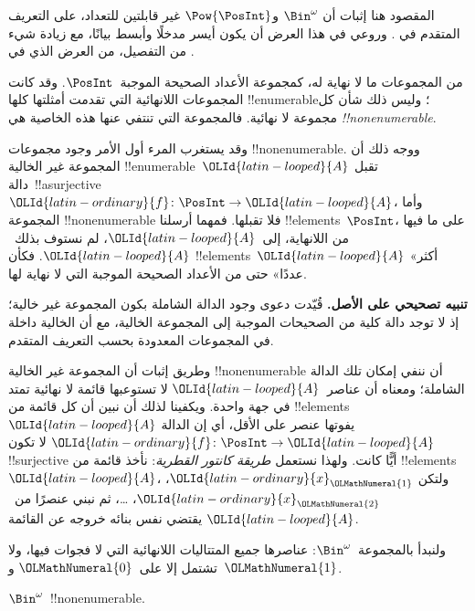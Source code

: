 \documentclass[../../../include/open-logic-section]{subfiles}
\begin{document}


\begin{editorial}
المقصود هنا إثبات أن $\Bin^\omega$ و$\Pow{\PosInt}$ غير قابلتين للتعداد، على التعريف المتقدم في . وروعي في هذا العرض أن يكون أيسر مدخلًا وأبسط بيانًا، مع زيادة شيء من التفصيل، من العرض الذي في .
\end{editorial}

من المجموعات ما لا نهاية له، كمجموعة الأعداد الصحيحة الموجبة~$\PosInt$. وقد كانت المجموعات اللانهائية التي تقدمت أمثلتها كلها !!{enumerable}؛ وليس ذلك شأن كل مجموعة لا نهائية. فالمجموعة التي تنتفي عنها هذه الخاصية هي \emph{!!{nonenumerable}}.

وقد يستغرب المرء أول الأمر وجود مجموعات !!{nonenumerable}. ووجه ذلك أن المجموعة غير الخالية !!{enumerable}~$\OLId{latin-looped}{A}$ تقبل دالة~!!a{surjective} $\OLId{latin-ordinary}{f} \colon \PosInt \to \OLId{latin-looped}{A}$، وأما المجموعة !!{nonenumerable} فلا تقبلها. فمهما أرسلنا !!{element}s~$\PosInt$، على ما فيها من اللانهاية، إلى~$\OLId{latin-looped}{A}$، لم نستوف بذلك~$\OLId{latin-looped}{A}$. فكأن !!{element}s~$\OLId{latin-looped}{A}$ «أكثر عددًا» حتى من الأعداد الصحيحة الموجبة التي لا نهاية لها.

\textbf{تنبيه تصحيحي على الأصل.} قُيّدت دعوى وجود الدالة الشاملة بكون
المجموعة غير خالية؛ إذ لا توجد دالة كلية من الصحيحات الموجبة إلى المجموعة الخالية،
مع أن الخالية داخلة في المجموعات المعدودة بحسب التعريف المتقدم.

وطريق إثبات أن المجموعة غير الخالية !!{nonenumerable} أن ننفي إمكان تلك الدالة الشاملة؛ ومعناه أن عناصر~$\OLId{latin-looped}{A}$ لا تستوعبها قائمة لا نهائية تمتد في جهة واحدة. ويكفينا لذلك أن نبين أن كل قائمة من !!{element}s~$\OLId{latin-looped}{A}$ يفوتها عنصر على الأقل، أي إن الدالة $\OLId{latin-ordinary}{f}\colon \PosInt \to \OLId{latin-looped}{A}$ لا تكون !!{surjective} أيًّا كانت. ولهذا نستعمل \emph{طريقة كانتور القطرية}: نأخذ قائمة من !!{element}s~$\OLId{latin-looped}{A}$، ولتكن $\OLId{latin-ordinary}{x}_\OLMathNumeral{1}$، $\OLId{latin-ordinary}{x}_\OLMathNumeral{2}$، \dots، ثم نبني عنصرًا من~$\OLId{latin-looped}{A}$ يقتضي نفس بنائه خروجه عن القائمة.

ولنبدأ بالمجموعة~$\Bin^\omega$: عناصرها جميع المتتاليات اللانهائية التي لا فجوات فيها، ولا تشتمل إلا على~$\OLMathNumeral{0}$ و~$\OLMathNumeral{1}$.

\begin{thm}
$\Bin^\omega$~!!{nonenumerable}.
\end{thm}
\end{document}

